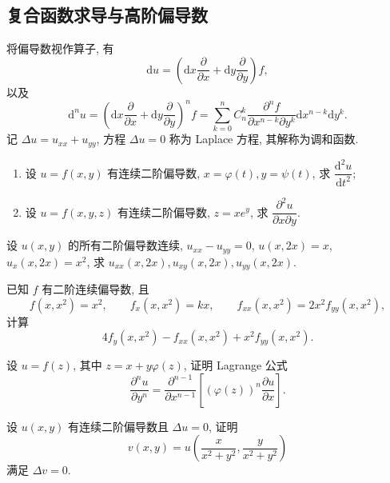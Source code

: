 \documentclass[../../数学分析培优讲义.tex]{subfiles}
\begin{document}
\subsection{复合函数求导与高阶偏导数}

将偏导数视作算子, 有
\[
    \mathrm{d}u=\left(\mathrm{d}x\dfrac{\partial}{\partial x}+\mathrm{d}y\dfrac{\partial}{\partial y}\right)f,
\]
以及
\[
    \mathrm{d}^nu
    =\left(\mathrm{d}x\dfrac{\partial}{\partial x}+\mathrm{d}y\dfrac{\partial}{\partial y}\right)^nf
    =\sum\limits_{k=0}^nC_n^k
    \dfrac{\partial^nf}{\partial x^{n-k}\partial y^k}
    \mathrm{d}x^{n-k}\mathrm{d}y^k.
\]
记 $\Delta u=u_{xx}+u_{yy}$, 方程 $\Delta u=0$ 称为 Laplace 方程, 其解称为调和函数.

\begin{example}
\begin{enumerate}[label=(\arabic*)]
    \item 设 $u=f(x,y)$ 有连续二阶偏导数, $x=\varphi(t),y=\psi(t)$, 求 $\dfrac{\mathrm{d}^2u}{\mathrm{d}t^2}$;
    \item 设 $u=f(x,y,z)$ 有连续二阶偏导数, $z=xe^y$, 求 $\dfrac{\partial^2u}{\partial x\partial y}$.
\end{enumerate}
\end{example}
\exampleblank

\begin{example}
设 $u(x,y)$ 的所有二阶偏导数连续, $u_{xx}-u_{yy}=0$, $u(x,2x)=x$, $u_x(x,2x)=x^2$, 求 $u_{xx}(x,2x),u_{xy}(x,2x),u_{yy}(x,2x)$.
\end{example}
\exampleblank

\begin{example}
已知 $f$ 有二阶连续偏导数, 且
\[
    f(x,x^2)=x^2,\qquad f_x(x,x^2)=kx,\qquad f_{xx}(x,x^2)=2x^2f_{yy}(x,x^2),
\]
计算
\[
    4f_y(x,x^2)-f_{xx}(x,x^2)+x^2f_{yy}(x,x^2).
\]
\end{example}
\exampleblank

\begin{example}
设 $u=f(z)$, 其中 $z=x+y\varphi(z)$, 证明 Lagrange 公式
\[
    \dfrac{\partial^nu}{\partial y^n}
    =\dfrac{\partial^{n-1}}{\partial x^{n-1}}
    \left[(\varphi(z))^n\dfrac{\partial u}{\partial x}\right].
\]
\end{example}
\exampleblank

\begin{example}
设 $u(x,y)$ 有连续二阶偏导数且 $\Delta u=0$, 证明
\[
    v(x,y)=u\left(\dfrac{x}{x^2+y^2},\dfrac{y}{x^2+y^2}\right)
\]
满足 $\Delta v=0$.
\end{example}
\exampleblank
\end{document}

